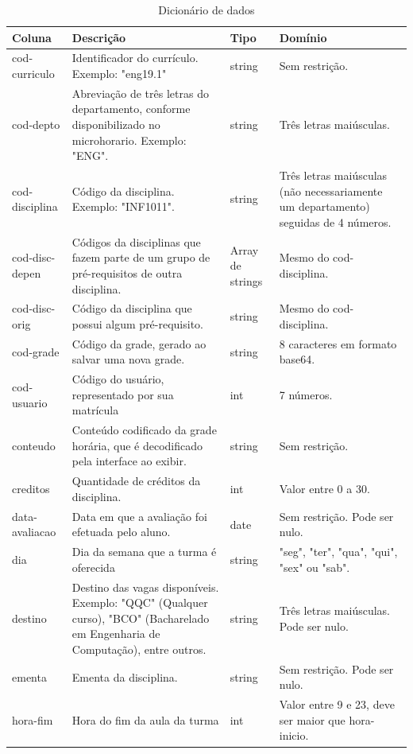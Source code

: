 \begin{longtable}{ | >{\raggedright}m{} | >{\raggedright}m{} | >{\raggedright}m{} | >{\raggedright}m{} | }
    
    \hline\textbf{Coluna} & \textbf{Descrição} & \textbf{Tipo} & \textbf{Domínio}\tabularnewline\hline\hline
    \endhead
    
    \hline\caption{Dicionário de dados}\endlastfoot

    cod-curriculo & Identificador do currículo. Exemplo: "eng19.1" & string & Sem restrição.\tabularnewline\hline
    cod-depto & Abreviação de três letras do departamento, conforme disponibilizado no microhorario. Exemplo: "ENG". & string & Três letras maiúsculas.\tabularnewline\hline
    cod-disciplina & Código da disciplina. Exemplo: "INF1011". & string & Três letras maiúsculas (não necessariamente um departamento) seguidas de 4 números.\tabularnewline\hline
    cod-disc-depen & Códigos da disciplinas que fazem parte de um grupo de pré-requisitos de outra disciplina. & Array de strings & Mesmo do cod-disciplina.\tabularnewline\hline
    cod-disc-orig & Código da disciplina que possui algum pré-requisito. & string & Mesmo do cod-disciplina.\tabularnewline\hline
    cod-grade & Código da grade, gerado ao salvar uma nova grade. & string & 8 caracteres em formato base64.\tabularnewline\hline
    cod-usuario & Código do usuário, representado por sua matrícula & int & 7 números.\tabularnewline\hline
    conteudo & Conteúdo codificado da grade horária, que é decodificado pela interface ao exibir. & string & Sem restrição.\tabularnewline\hline
    creditos & Quantidade de créditos da disciplina. & int & Valor entre 0 a 30.\tabularnewline\hline
    data-avaliacao & Data em que a avaliação foi efetuada pelo aluno. & date & Sem restrição. Pode ser nulo.\tabularnewline\hline
    dia & Dia da semana que a turma é oferecida & string & "seg", "ter", "qua", "qui", "sex" ou "sab".\tabularnewline\hline
    destino & Destino das vagas disponíveis. Exemplo: "QQC" (Qualquer curso), "BCO" (Bacharelado em Engenharia de Computação), entre outros. & string & Três letras maiúsculas. Pode ser nulo.\tabularnewline\hline
    ementa & Ementa da disciplina. & string & Sem restrição. Pode ser nulo.\tabularnewline\hline
    hora-fim & Hora do fim da aula da turma & int & Valor entre 9 e 23, deve ser maior que hora-inicio.\tabularnewline\hline

\end{longtable}
